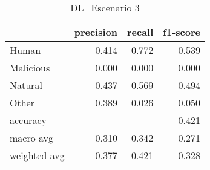 \begin{table}
\centering
\caption{DL_Escenario 3}
\label{tab:Reporte de clasificación para el Escenario 3 utilizando Discriminante Lineal}
\begin{tabular}{lrrr}
\toprule
{} &  precision &  recall &  f1-score \\
\midrule
Human        &      0.414 &   0.772 &     0.539 \\
Malicious    &      0.000 &   0.000 &     0.000 \\
Natural      &      0.437 &   0.569 &     0.494 \\
Other        &      0.389 &   0.026 &     0.050 \\
accuracy     &            &         &     0.421 \\
macro avg    &      0.310 &   0.342 &     0.271 \\
weighted avg &      0.377 &   0.421 &     0.328 \\
\bottomrule
\end{tabular}
\end{table}
